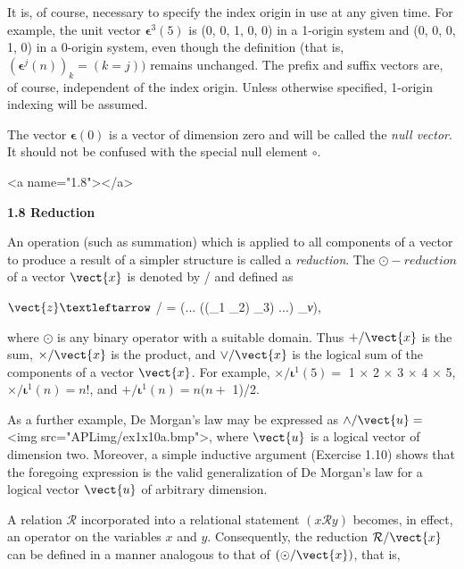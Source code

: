 \par It is, of course, necessary to specify the index origin in use at any given time. For example, the unit vector $\textbf{ϵ}^3(5)$ is (0, 0, 1, 0, 0) in a 1-origin system and (0, 0, 0, 1, 0) in a 0-origin system, even though the definition (that is, $(\textbf{ϵ}^j(n))_k = (k = j))$ remains unchanged. The prefix and suffix vectors are, of course, independent of the index origin. Unless otherwise specified, 1-origin indexing will be assumed.

\par The vector $\textbf{ϵ}(0)$ is a vector of dimension zero and will be called the \textit{null vector}. It should not be confused with the special null element $∘$.

<a name="1.8"></a>
\par \textbf{1.8 Reduction}

\par An operation (such as summation) which is applied to all components of a vector to produce a result of a simpler structure is called a \textit{reduction}. The $\odot-reduction$ of a vector $\vect{x}$ is denoted by
\odot/ and defined as

\par $\vect{z} ←$ 
\odot/ \leftrightarrow {} = (... ((_1
\odot {}_2)
\odot {}_3)
\odot ...) 
\odot {}_{\textit{ν}}),

\par where $\odot$ is any binary operator with a suitable domain. Thus $+/\vect{x}$ is the sum, $\times/\vect{x}$ is the product, and $\vee/\vect{x}$ is the logical sum of the components of a vector $\vect{x}$. For example, $\times/\textbf{ι}^1(5) =$ 1 $\times$ 2 $\times$ 3 $\times$ 4 $\times$ 5, $\times/\textbf{ι}^1(n) = n!$, and $+/\textbf{ι}^1(n) = n(n +$ 1)/2.

\par As a further example, De Morgan's law may be expressed as $\wedge/\vect{u} =$ <img src="APLimg/ex1x10a.bmp">, where $\vect{u}$ is a logical vector of dimension two. Moreover, a simple inductive argument (Exercise 1.10) shows that the foregoing expression is the valid generalization of De Morgan's law for a logical vector $\vect{u}$ of arbitrary dimension.

\par A relation $\mathcal{R}$ incorporated into a relational statement $(x\mathcal{R}y)$ becomes, in effect, an operator on the variables $x$ and $y$. Consequently, the reduction $\mathcal{R}/\vect{x}$ can be defined in a manner analogous to that of $(\odot/\vect{x})$, that is,

